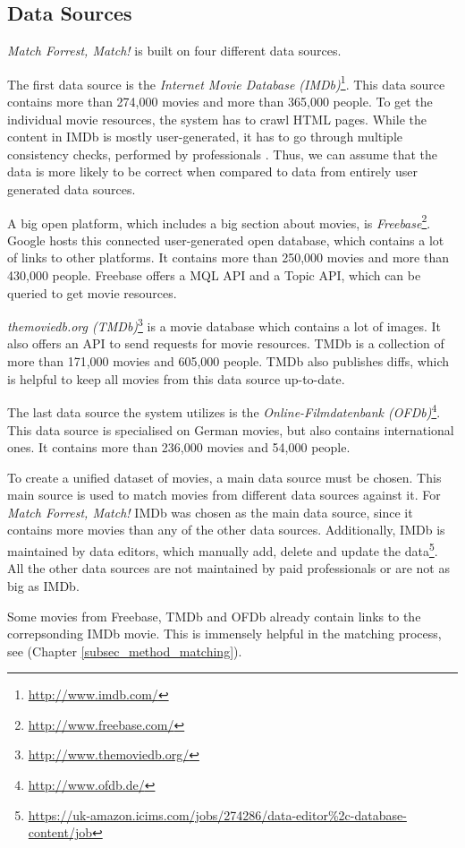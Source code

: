 \subsection{Data Sources}
\label{subsec_method_datasources}

\emph{Match Forrest, Match!} is built on four different data sources.

The first data source is the \textit{Internet Movie Database (IMDb)}\footnote{\url{http://www.imdb.com/}}.
This data source contains more than 274,000 movies and more than 365,000 people.
To get the individual movie resources, the system has to crawl HTML pages.
While the content in IMDb is mostly user-generated, it has to go through multiple consistency checks, performed by professionals \cite{IMDb_DataCreation}.
Thus, we can assume that the data is more likely to be correct when compared to data from entirely user generated data sources.

A big open platform, which includes a big section about movies, is \textit{Freebase}\footnote{\url{http://www.freebase.com/}}.
Google hosts this connected user-generated open database, which contains a lot of links to other platforms.
It contains more than 250,000 movies and more than 430,000 people.
Freebase offers a MQL API and a Topic API, which can be queried to get movie resources.

\textit{themoviedb.org (TMDb)}\footnote{\url{http://www.themoviedb.org/}} is a movie database which contains a lot of images.
It also offers an API to send requests for movie resources.
TMDb is a collection of more than 171,000 movies and 605,000 people.
TMDb also publishes diffs, which is helpful to keep all movies from this data source up-to-date.

The last data source the system utilizes is the \textit{Online-Filmdatenbank (OFDb)}\footnote{\url{http://www.ofdb.de/}}.
This data source is specialised on German movies, but also contains international ones.
It contains more than 236,000 movies and 54,000 people.

To create a unified dataset of movies, a main data source must be chosen.
This main source is used to match movies from different data sources against it.
For \emph{Match Forrest, Match!} IMDb was chosen as the main data source, since it contains more movies than any of the other data sources.
Additionally, IMDb is maintained by data editors, which manually add, delete and update the data\footnote{\url{https://uk-amazon.icims.com/jobs/274286/data-editor\%2c-database-content/job}}.
All the other data sources are not maintained by paid professionals or are not as big as IMDb.

Some movies from Freebase, TMDb and OFDb already contain links to the correpsonding IMDb movie.
This is immensely helpful in the matching process, see (Chapter \ref{subsec_method_matching}).